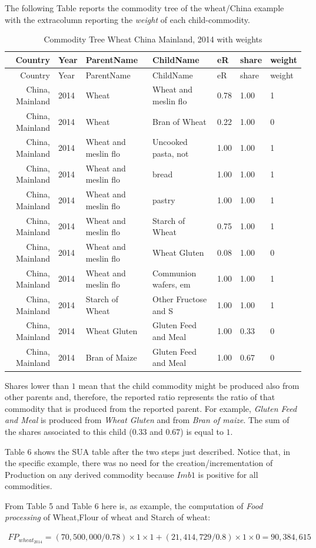 \documentclass[]{article}
\begin{document}
The following Table reports the commodity tree of the wheat/China
example with the extracolumn reporting the \emph{weight} of each
child-commodity.

\begin{longtable}[]{@{}rllllll@{}}
\caption{Commodity Tree Wheat China Mainland, 2014 with
weights}\tabularnewline
\toprule
Country & Year & ParentName & ChildName & eR & share &
weight\tabularnewline
\midrule
\endfirsthead
\toprule
Country & Year & ParentName & ChildName & eR & share &
weight\tabularnewline
\midrule
\endhead
China, Mainland & 2014 & Wheat & Wheat and meslin flo & 0.78 & 1.00 &
1\tabularnewline
China, Mainland & 2014 & Wheat & Bran of Wheat & 0.22 & 1.00 &
0\tabularnewline
China, Mainland & 2014 & Wheat and meslin flo & Uncooked pasta, not &
1.00 & 1.00 & 1\tabularnewline
China, Mainland & 2014 & Wheat and meslin flo & bread & 1.00 & 1.00 &
1\tabularnewline
China, Mainland & 2014 & Wheat and meslin flo & pastry & 1.00 & 1.00 &
1\tabularnewline
China, Mainland & 2014 & Wheat and meslin flo & Starch of Wheat & 0.75 &
1.00 & 1\tabularnewline
China, Mainland & 2014 & Wheat and meslin flo & Wheat Gluten & 0.08 &
1.00 & 0\tabularnewline
China, Mainland & 2014 & Wheat and meslin flo & Communion wafers, em &
1.00 & 1.00 & 1\tabularnewline
China, Mainland & 2014 & Starch of Wheat & Other Fructose and S & 1.00 &
1.00 & 1\tabularnewline
China, Mainland & 2014 & Wheat Gluten & Gluten Feed and Meal & 1.00 &
0.33 & 0\tabularnewline
China, Mainland & 2014 & Bran of Maize & Gluten Feed and Meal & 1.00 &
0.67 & 0\tabularnewline
\bottomrule
\end{longtable}

Shares lower than \(1\) mean that the child commodity might be produced
also from other parents and, therefore, the reported ratio represents
the ratio of that commodity that is produced from the reported parent.
For example, \emph{Gluten Feed and Meal} is produced from \emph{Wheat
Gluten} and from \emph{Bran of maize}. The sum of the shares associated
to this child (\(0.33\) and \(0.67\)) is equal to \(1\).

Table 6 shows the SUA table after the two steps just described. Notice
that, in the specific example, there was no need for the
creation/incrementation of Production on any derived commodity because
\(Imb1\) is positive for all commodities.

From Table 5 and Table 6 here is, as example, the computation of
\emph{Food processing} of Wheat,Flour of wheat and Starch of wheat:

\begin{equation}
\begin{multlined}
\label{eq:wheatFP}
FP_{wheat_{2014}} = \left(70,500,000/0.78\right)\times 1\times 1 +\left(21,414,729/0.8\right)\times 1\times 0 = 90,384,615
\end{multlined}
\end{equation}
\end{document}
